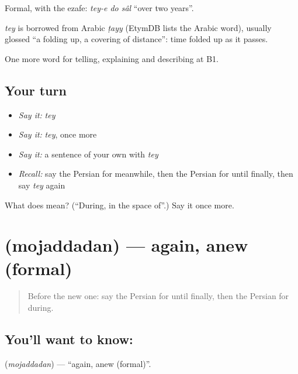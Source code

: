 Formal, with the ezafe: \emph{tey-e do sâl} \textquotedblleft{}over two years\textquotedblright{}.

\begin{cousinweb}
\emph{tey} is borrowed from Arabic \emph{ṭayy} (EtymDB lists the Arabic word), usually glossed \textquotedblleft{}a folding up, a covering of distance\textquotedblright{}: time folded up as it passes.
\end{cousinweb}

\begin{grammarlens}[title={What you've built}]
One more word for telling, explaining and describing at B1.
\end{grammarlens}

\subsection*{Your turn}
\begin{itemize}
\raggedright
  \item \emph{Say it:} \emph{tey}
  \item \emph{Say it:} \emph{tey}, once more
  \item \emph{Say it:} a sentence of your own with \emph{tey}
  \item \emph{Recall:} say the Persian for meanwhile, then the Persian for until finally, then say \emph{tey} again
\end{itemize}

\begin{tcolorbox}[breakable,colback=teal!4,colframe=teal!35!black,title={Before you move on}]
What does  mean? (\textquotedblleft{}During, in the space of\textquotedblright{}.) Say it once more.
\end{tcolorbox}
\section[\texorpdfstring{\fa{مجددا} (mojaddadan)}{مجددا (mojaddadan)}]{ (mojaddadan) — again, anew (formal)}

\label{lesson:FA-C306-mojaddadan}



\begin{quote}
Before the new one: say the Persian for until finally, then the Persian for during.
\end{quote}

\subsection*{You'll want to know: }
\textbf{} (\emph{mojaddadan}) — \textquotedblleft{}again, anew (formal)\textquotedblright{}.

